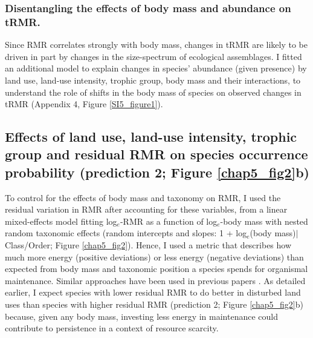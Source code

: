 
\subsubsection*{Disentangling the effects of body mass and abundance on tRMR.}
Since RMR correlates strongly with body mass, changes in tRMR are likely to be driven in part by changes in the size-spectrum of ecological assemblages. I fitted an additional model to explain changes in species' abundance (given presence) by land use, land-use intensity, trophic group, body mass and their interactions, to understand the role of shifts in the body mass of species on observed changes in tRMR (Appendix 4, Figure \ref{SI5_figure1}).  

\subsection{Effects of land use, land-use intensity, trophic group and residual RMR on species occurrence probability (prediction 2; Figure \ref{chap5_fig2}b)}

To control for the effects of body mass and taxonomy on RMR, I used the residual variation in RMR after accounting for these variables, from a linear mixed-effects model fitting log$_e$-RMR as a function of log$_e$-body mass with nested random taxonomic effects (random intercepts and slopes: 1 + log$_e$(body mass)$\mid$Class/Order; Figure \ref{chap5_fig2}). Hence, I used a metric that describes how much more energy (positive deviations) or less energy (negative deviations) than expected from body mass and taxonomic position a species spends for organismal maintenance. Similar approaches have been used in previous papers \citep{Furness2008, Naya2013}. As detailed earlier, I expect species with lower residual RMR to do better in disturbed land uses than species with higher residual RMR (prediction 2; Figure \ref{chap5_fig2}b) because, given any body mass, investing less energy in maintenance could contribute to persistence in a context of resource scarcity. 

